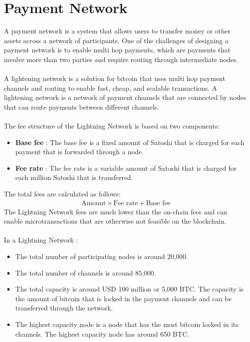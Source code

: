 \section{Payment Network}
A payment network is a system that allows users to transfer money or other assets across a network of participants. One of the challenges of designing a payment network is to enable multi hop payments, which are payments that involve more than two parties and require routing through intermediate nodes.\\\\
A lightening network is a solution for bitcoin that uses multi hop payment channels and routing to enable fast, cheap, and scalable transactions. A lightening network is a network of payment channels that are connected by nodes that can route payments between different channels.\\\\
The fee structure of the Lightning Network is based on two components:
\begin{itemize}
	\item \textbf{Base fee} : The base fee is a fixed amount of Satoshi that is charged for each payment that is forwarded through a node.
	\item \textbf{Fee rate} : The fee rate is a variable amount of Satoshi that is charged for each million Satoshi that is transferred.
\end{itemize}
The total fees are calculated as follows:
\begin{align*}
	\text{Amount}\times\text{Fee rate} + \text{Base fee}
\end{align*}
The Lightning Network fees are much lower than the on-chain fees and can enable microtransactions that are otherwise not feasible on the blockchain.\\\\
In a Lightning Network :
\begin{itemize}
	\item The total number of participating nodes is around 20,000.
	\item The total number of channels is around 85,000.
	\item The total capacity is around USD 100 million or 5,000 BTC. The capacity is the amount of bitcoin that is locked in the payment channels and can be transferred through the network.
	\item The highest capacity node is a node that has the most bitcoin locked in its channels. The highest capacity node has around 650 BTC.
\end{itemize}
